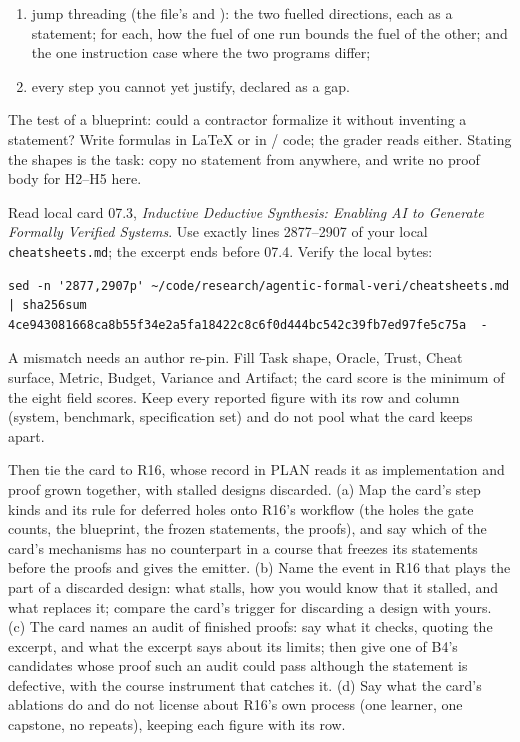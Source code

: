 \documentclass[11pt]{article}
\begin{document}
\begin{problem}
\begin{enumerate}
  nothing is treated;
\item[(f)] jump threading (the file's  and ): the two
  fuelled directions, each as a statement; for each, how the fuel of one run
  bounds the fuel of the other; and the one instruction case where the two
  programs differ;
\item[(g)] every step you cannot yet justify, declared as a gap.
\end{enumerate}
The test of a blueprint: could a contractor formalize it without inventing a
statement? Write formulas in \LaTeX{} or in / code; the
grader reads either. Stating the shapes is the task: copy no statement from
anywhere, and write no proof body for H2--H5 here.
\end{problem}

\begin{problem}\label{prob:B2}
Read local card 07.3, \emph{Inductive Deductive Synthesis: Enabling AI to
Generate Formally Verified Systems}. Use exactly lines 2877--2907 of your
local \texttt{cheatsheets.md}; the excerpt ends before 07.4. Verify the local
bytes:
\begin{verbatim}
sed -n '2877,2907p' ~/code/research/agentic-formal-veri/cheatsheets.md | sha256sum
4ce943081668ca8b55f34e2a5fa18422c8c6f0d444bc542c39fb7ed97fe5c75a  -
\end{verbatim}
A mismatch needs an author re-pin. Fill Task shape, Oracle, Trust, Cheat
surface, Metric, Budget, Variance and Artifact; the card score is the minimum
of the eight field scores. Keep every reported figure with its row and column
(system, benchmark, specification set) and do not pool what the card keeps
apart.

Then tie the card to R16, whose record in PLAN reads it as implementation and
proof grown together, with stalled designs discarded. (a) Map the card's step
kinds and its rule for deferred holes onto R16's workflow (the holes the gate
counts, the blueprint, the frozen statements, the proofs), and say which of
the card's mechanisms has no counterpart in a course that freezes its
statements before the proofs and gives the emitter. (b) Name the event in R16
that plays the part of a discarded design: what stalls, how you would know
that it stalled, and what replaces it; compare the card's trigger for
discarding a design with yours. (c) The card names an audit of finished
proofs: say what it checks, quoting the excerpt, and what the excerpt says
about its limits; then give one of B4's candidates whose proof such an audit
could pass although the statement is defective, with the course instrument
that catches it. (d) Say what the card's ablations do and do not license about
R16's own process (one learner, one capstone, no repeats), keeping each figure
with its row.
\end{problem}
\end{document}
